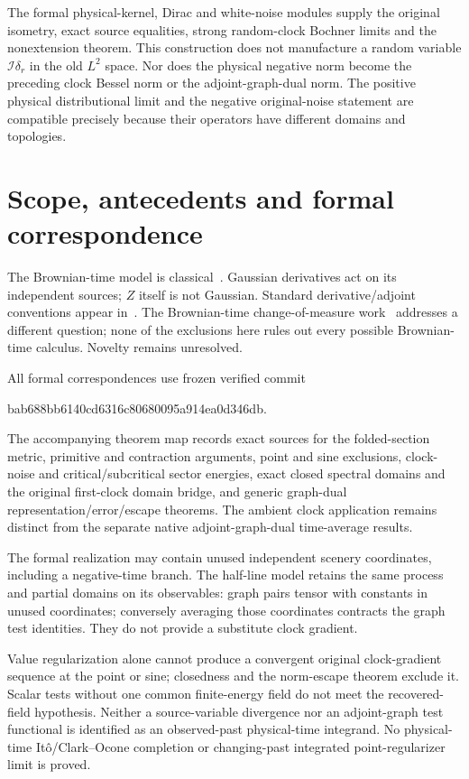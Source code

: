 \documentclass[11pt]{article}
\begin{document}
The formal physical-kernel, Dirac and white-noise modules supply
the original isometry, exact source equalities, strong random-clock
Bochner limits and the nonextension theorem. This construction
does not manufacture a random variable $\mathcal I\delta_r$ in
the old $L^2$ space. Nor does the physical negative norm become
the preceding clock Bessel norm or the adjoint-graph-dual norm. The positive physical distributional limit and the
negative original-noise statement are compatible precisely because
their operators have different domains and topologies.

\section{Scope, antecedents and formal correspondence}
The Brownian-time model is classical~\cite{alloubazheng}.
Gaussian derivatives act on its independent sources;
$Z$ itself is not Gaussian. Standard derivative/adjoint
conventions appear in~\cite{sottinen}. The Brownian-time
change-of-measure work~\cite{change} addresses a different
question; none of the exclusions here rules out every
possible Brownian-time calculus. Novelty remains unresolved.

All formal correspondences use frozen verified commit
\begin{center}\small\ttfamily
bab688bb6140cd6316c80680095a914ea0d346db.
\end{center}
The accompanying theorem map records exact sources for
the folded-section metric, primitive and contraction
arguments, point and sine exclusions, clock-noise and
critical/subcritical sector energies, exact closed spectral domains and
the original first-clock domain bridge, and generic graph-dual
representation/error/escape theorems. The ambient clock
application remains distinct from the separate native
adjoint-graph-dual time-average results.

The formal realization may contain unused independent
scenery coordinates, including a negative-time branch.
The half-line model retains the same process and partial
domains on its observables: graph pairs tensor with
constants in unused coordinates; conversely averaging
those coordinates contracts the graph test identities.
They do not provide a substitute clock gradient.

Value regularization alone cannot produce a convergent
original clock-gradient sequence at the point or sine;
closedness and the norm-escape theorem exclude it.
Scalar tests without one common finite-energy field do
not meet the recovered-field hypothesis. Neither a
source-variable divergence nor an adjoint-graph test
functional is identified as an observed-past physical-time
integrand. No physical-time It\^o/Clark--Ocone completion
or changing-past integrated point-regularizer limit is proved.
\end{document}

